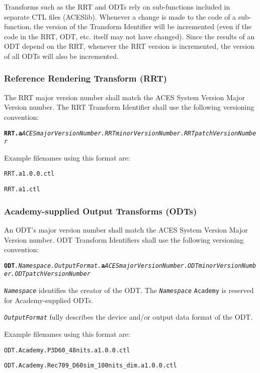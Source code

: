 Transforms such as the RRT and ODTs rely on sub-functions included in separate CTL files (ACESlib). Whenever a change is made to the code of a sub-function, the version of the Transform Identifier will be incremented (even if the code in the RRT, ODT, etc. itself may not have changed). Since the results of an ODT depend on the RRT, whenever the RRT version is incremented, the version of all ODTs will also be incremented.

\subsubsection{Reference Rendering Transform (RRT)}
The RRT major version number shall match the ACES System Version Major Version number. The RRT Transform Identifier shall use the following versioning convention:

\texttt{\textbf{RRT.a}\textit{ACESmajorVersionNumber.RRTminorVersionNumber.RRTpatchVersionNumber}}

Example filenames using this format are: 
\begin{listize}
	\item \texttt{RRT.a1.0.0.ctl}
	\item \texttt{RRT.a1.ctl}
\end{listize}

\subsubsection{Academy-supplied Output Transforms (ODTs)}
An ODT's major version number shall match the ACES System Version Major Version number. ODT Transform Identifiers shall use the following versioning convention:

{\fontsize{7.5pt}{9pt}\selectfont
\texttt{\textbf{ODT}\textit{.Namespace.OutputFormat.\-}\textbf{a}\textit{ACESmajorVersionNumber.\-ODTminor\-Version\-Number.\-ODTpatchVersionNumber}} }

\texttt{\textit{Namespace}} identifies the creator of the ODT. The \texttt{\textit{Namespace}} \texttt{Academy} is reserved for Academy-supplied ODTs.

\texttt{\textit{OutputFormat}} fully describes the device and/or output data format of the ODT.

Example filenames using this format are:
\begin{listize}
	\item \texttt{ODT.Academy.P3D60\_48nits.a1.0.0.ctl}
	\item \texttt{ODT.Academy.Rec709\_D60sim\_100nits\_dim.a1.0.0.ctl}
\end{listize}

